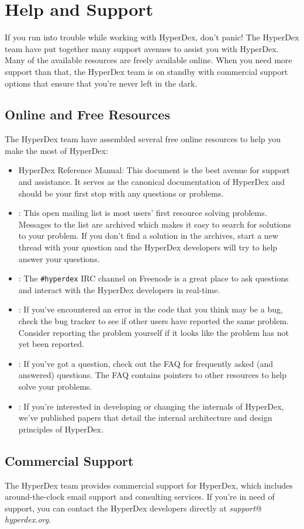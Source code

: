 \section{Help and Support}

If you run into trouble while working with HyperDex, don't panic!  The HyperDex
team have put together many support avenues to assist you with HyperDex.  Many
of the available resources are freely available online.  When you need more
support than that, the HyperDex team is on standby with commercial support
options that ensure that you're never left in the dark.

\subsection{Online and Free Resources}

The HyperDex team have assembled several free online resources to help you make
the most of HyperDex:

\begin{itemize}
\item HyperDex Reference Manual:  This document is the best avenue for support
    and assistance.  It serves as the canonical documentation of HyperDex and
    should be your first stop with any questions or problems.
\item {}:
    This open mailing list is most users' first resource solving problems.
    Messages to the list are archived which makes it easy to search for
    solutions to your problem.  If you don't find a solution in the archives,
    start a new thread with your question and the HyperDex developers will try
    to help answer your questions.
\item {}:
    The \texttt{\#hyperdex} IRC channel on Freenode is a great place to ask
    questions and interact with the HyperDex developers in real-time.
\item {}:
    If you've encountered an error in the code that you think may be a bug,
    check the bug tracker to see if other users have reported the same problem.
    Consider reporting the problem yourself if it looks like the problem has not
    yet been reported.
\item {}:
    If you've got a question, check out the FAQ for frequently asked (and
    answered) questions.  The FAQ contains pointers to other resources to help
    solve your problems.
\item {}:
    If you're interested in developing or changing the internals of HyperDex,
    we've published papers that detail the internal architecture and design
    principles of HyperDex.
\end{itemize}

\subsection{Commercial Support}

The HyperDex team provides commercial support for HyperDex, which includes
around-the-clock email support and consulting services.  If you're in need of
support, you can contact the HyperDex developers directly at {\em support}@{\em
hyperdex.org}.
